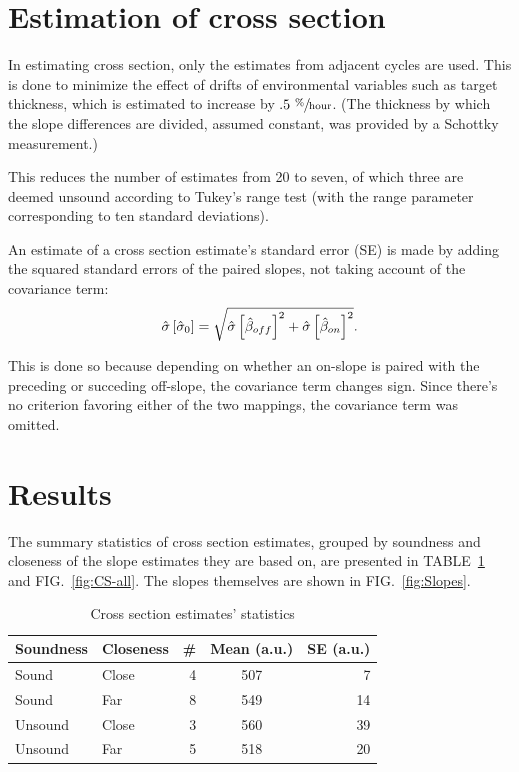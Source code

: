 \documentclass[reprint]{revtex4-1}
\begin{document}
\section{Estimation of cross section}

In estimating cross section, only the estimates from adjacent cycles are used. This is done to minimize the effect of drifts of environmental variables such as target thickness, which is estimated to increase by $.5~ \sfrac{\%}{\mathrm{hour}}$. (The thickness by which the slope differences are divided, assumed constant, was provided by a Schottky measurement.)

This reduces the number of estimates from 20 to seven, of which three are deemed unsound according to Tukey's range test (with the range parameter corresponding to ten standard deviations). 

An estimate of a cross section estimate's standard error (SE) is made by adding the squared standard errors of the paired slopes, not taking account of the covariance term:
\begin{equation}
	\SE*{\CS*[0]} = \sqrt{\SE*{\slp*[off]}^2 + \SE*{\slp*[on]}^2}.
\end{equation}

This is done so because depending on whether an on-slope is paired with the preceding or succeding off-slope, the covariance term changes sign. Since there's no criterion favoring either of the two mappings, the covariance term was omitted.


\section{Results}

The summary statistics of cross section estimates, grouped by soundness and closeness of the slope estimates they are based on, are presented in TABLE~\ref{tbl:CS-all} and FIG.~\ref{fig:CS-all}. The slopes themselves are shown in FIG.~\ref{fig:Slopes}.

\begin{table}
\centering
\caption{Cross section estimates' statistics\label{tbl:CS-all}}
\begin{tabular}{llrcr}
\hline\hline
Soundness	& Closeness		& \#		& Mean (a.u.)		& SE (a.u.) \\
\hline
Sound		& Close			& 4			& 507				& 7  \\
Sound		& Far			& 8			& 549				& 14 \\
Unsound		& Close			& 3			& 560				& 39 \\
Unsound		& Far			& 5			& 518				& 20 \\
\end{tabular}
\end{table}
\end{document}
